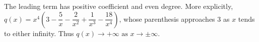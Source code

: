 The leading term has positive coefficient and even degree. More explicitly, $ q(x)=x^4\left(3-\dfrac{5}{x}-\dfrac{2}{x^2}+\dfrac{1}{x^3}-\dfrac{18}{x^4}\right)$, whose parenthesis approaches $ 3 $ as $ x $ tends to either infinity. Thus $\boxed{q(x)\to+\infty\text{ as }x\to\pm\infty}$.
